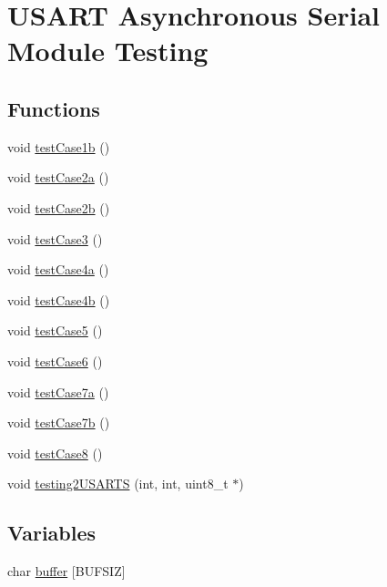 \hypertarget{group__test_lib_module}{}\section{U\+S\+A\+R\+T Asynchronous Serial Module Testing}
\label{group__test_lib_module}
\subsection*{Functions}
\begin{DoxyCompactItemize}
\item 
void \hyperlink{group__test_lib_module_ga61c9da46a8b9b11d2a8e80f9455b6621}{test\+Case1b} ()
\item 
void \hyperlink{group__test_lib_module_ga3c7b4abb40563fadae17497ba29c436b}{test\+Case2a} ()
\item 
void \hyperlink{group__test_lib_module_ga5bc7ab87101dd4c95a3672264f8f5125}{test\+Case2b} ()
\item 
void \hyperlink{group__test_lib_module_gaa5cf1ffc397cad267ae2cd3ac4be2d1c}{test\+Case3} ()
\item 
void \hyperlink{group__test_lib_module_ga2d24679a76426292b1124c9199fbeefa}{test\+Case4a} ()
\item 
void \hyperlink{group__test_lib_module_ga1d0d9127147431bdedd66046d2c5a47a}{test\+Case4b} ()
\item 
void \hyperlink{group__test_lib_module_gab46667e7f4dc32d3a4e2660ba0c20568}{test\+Case5} ()
\item 
void \hyperlink{group__test_lib_module_gaeb12359662ac449e826155c79d65637c}{test\+Case6} ()
\item 
void \hyperlink{group__test_lib_module_gad0ce05f776690e7cab14c22c4ce8834a}{test\+Case7a} ()
\item 
void \hyperlink{group__test_lib_module_ga1891010ade2f2ab501a17b2bf2474872}{test\+Case7b} ()
\item 
void \hyperlink{group__test_lib_module_gaeeb897dbfded9a17cad6053d83dbc8d3}{test\+Case8} ()
\item 
void \hyperlink{group__test_lib_module_ga56c83e96e3a1c3615a9fe20ea6e462ee}{testing2\+U\+S\+A\+R\+T\+S} (int, int, uint8\+\_\+t $\ast$)
\end{DoxyCompactItemize}
\subsection*{Variables}
\begin{DoxyCompactItemize}
\item 
char \hyperlink{group__test_lib_module_ga57875f7dc50e8d10d66a9dee808b1f25}{buffer} \mbox{[}B\+U\+F\+S\+I\+Z\mbox{]}
\end{DoxyCompactItemize}


